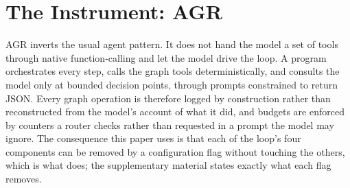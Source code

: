 %
%
%
%
%

\section{The Instrument: AGR}\label{sec:framework}

AGR inverts the usual agent pattern. It does not hand the model a set of
tools through native function-calling and let the model drive the loop.
A program orchestrates every step, calls the graph tools
deterministically, and consults the model only at bounded decision
points, through prompts constrained to return JSON. Every graph
operation is therefore logged by construction rather than reconstructed
from the model's account of what it did, and budgets are enforced by
counters a router checks rather than requested in a prompt the model may
ignore. The consequence this paper uses is that each of the loop's four
components can be removed by a configuration flag without touching the
others, which is what  does; the supplementary
material states exactly what each flag removes.

